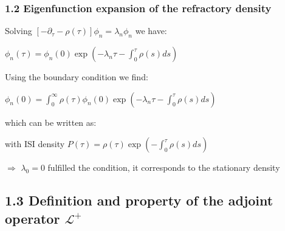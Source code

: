 \documentclass{beamer}
\begin{document}
\begin{frame}
\frametitle{1.2 Eigenfunction expansion of the refractory density}

Solving $[-\partial_{\tau}-\rho(\tau)]\phi_n=\lambda_n\phi_n$ we have:

\vspace{0.2cm}

\hspace{1.8cm}$\phi_n(\tau)=\phi_n(0)\exp(-\lambda_n\tau-\int_0^\tau\rho(s)ds)$

\vspace{0.5cm}
\pause
Using the boundary condition we find:

\vspace{0.2cm}

\hspace{1.8cm}$\phi_n(0)=\int_0^{\infty}\rho(\tau)\phi_n(0)\exp(-\lambda_n\tau-\int_0^\tau\rho(s)ds)$

\vspace{0.5cm}
\pause
which can be written as:

\vspace{0.2cm}

\hspace{2.5cm}

\vspace{0.5cm}
with ISI density $P(\tau)=\rho(\tau) \exp(-\int_0^\tau\rho(s)ds)$

\vspace{0.5cm}
\pause
$\Rightarrow$ $\lambda_0=0$ fulfilled the condition, it corresponds to the stationary density


\end{frame}

\subsection{1.3 Definition and property of the adjoint operator $\mathcal{L}^+$}
\end{document}

